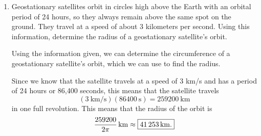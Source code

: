 \documentclass[main]{subfiles}
\begin{document}
\begin{enumerate}[resume]
\begin{enumerate}
\begin{solution}
      Since $\pi$ radians is the same as $180^\circ$, $\frac{1}{60}\si{\degree} = 
      \left( \frac{\pi \text{ radians}}{\ang{180}}
      \right) \frac{1}{60}\si{\degree} = \frac{\pi}{180 \cdot 60} \text{
        radians} = \boxed{\tfrac{\pi}{10800} \text{ radians}}$.
    \end{solution}

  \item
    \begin{problem}[\vfill]
      Earth's radius is about 3960 miles. Use this to approximate
      the length of a nautical mile in \textbf{feet}. (1 mile $=$
      5280 feet.)      
    \end{problem}

    \begin{solution}
      As in {{\#4}}, the key is to think about what
      proportion of an entire circle we have.  Since the angle subtended
      by a nautical mile is $\frac{\pi}{10800}$ and the angle subtended by
      an entire circle is $2 \pi$, a
      nautical mile is $\frac{\pi/10800}{2 \pi}$ of the whole
      circumference of the earth, so
      \begin{align*}
        1 \text{ nautical mile} &= \underbrace{\frac{\pi/10800}{2
            \pi}}_{\text{proportion of circle}} \cdot \underbrace{2 \pi
          \cdot 3960 \text{ miles}}_{\text{circumference of earth}} \\
        &= \frac{3960 \pi}{10800} \text{ miles} \\
        &= \left( \frac{3960 \pi}{10800} \text{ miles} \right)(5280 \text{
          feet/mile}) \\
        &= \boxed{1936 \pi \text{ feet}}
      \end{align*}      
    \end{solution}

  \end{enumerate}

\item 
\begin{problem}
    Geostationary satellites orbit in circles high above the Earth with an orbital period of 24 hours, so they always remain above the same spot on the ground. They travel at a speed of about 3 kilometers per second. Using this information, determine the radius of a geostationary satellite's orbit.
\end{problem}
\pspace{\vfill}

\begin{solution}
    Using the information given, we can determine the circumference of a geostationary satellite's orbit, which we can use to find the radius.

    Since we know that the satellite travels at a speed of 3 km/s and has a period of 24 hours or 86,400 seconds, this means that the satellite travels
    \[\left(\SI{3}{\kilo\meter\per\second}\right)(\SI{86400}{\second}) = \SI{259200}{\kilo\meter}\]
    in one full revolution. This means that the radius of the orbit is
    \[\frac{259200}{2\pi}\,\si{\kilo\meter} \approx \fbox{\SI{41253}{\kilo\meter}.}\]
\end{solution}

\end{enumerate}
\end{document}
